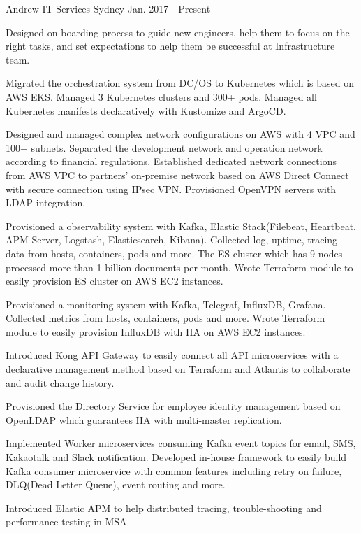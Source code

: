 \begin{cventries}
  {Andrew IT Services} %
  {Sydney} %
  {Jan. 2017 - Present} %
  { \begin{cvitems} %
  \item {Designed on-boarding process to guide new engineers, help them to focus on the right tasks, and set expectations to help them be successful at Infrastructure team.} \item {Migrated the orchestration system from DC/OS to Kubernetes which is based on AWS EKS. Managed 3 Kubernetes clusters and 300+ pods. Managed all Kubernetes manifests declaratively with Kustomize and ArgoCD.} \item {Designed and managed complex network configurations on AWS with 4 VPC and 100+ subnets. Separated the development network and operation network according to financial regulations. Established dedicated network connections from AWS VPC to partners' on-premise network based on AWS Direct Connect with secure connection using IPsec VPN. Provisioned OpenVPN servers with LDAP integration.} \item {Provisioned a observability system with Kafka, Elastic Stack(Filebeat, Heartbeat, APM Server, Logstash, Elasticsearch, Kibana). Collected log, uptime, tracing data from hosts, containers, pods and more. The ES cluster which has 9 nodes processed more than 1 billion documents per month. Wrote Terraform module to easily provision ES cluster on AWS EC2 instances.} \item {Provisioned a monitoring system with Kafka, Telegraf, InfluxDB, Grafana. Collected metrics from hosts, containers, pods and more. Wrote Terraform module to easily provision InfluxDB with HA on AWS EC2 instances.} \item {Introduced Kong API Gateway to easily connect all API microservices with a declarative management method based on Terraform and Atlantis to collaborate and audit change history.} \item {Provisioned the Directory Service for employee identity management based on OpenLDAP which guarantees HA with multi-master replication.} \item {Implemented Worker microservices consuming Kafka event topics for email, SMS, Kakaotalk and Slack notification. Developed in-house framework to easily build Kafka consumer microservice with common features including retry on failure, DLQ(Dead Letter Queue), event routing and more.} \item {Introduced Elastic APM to help distributed tracing, trouble-shooting and performance testing in MSA.}\end{cvitems} }


\end{cventries}
